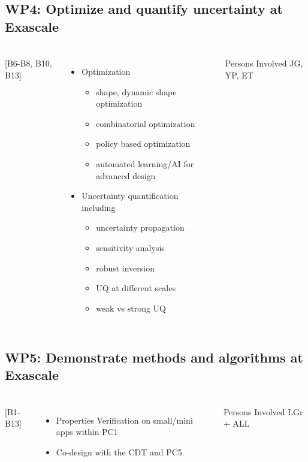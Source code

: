 \subsection{WP4: Optimize and quantify uncertainty at Exascale }
\begin{frame}
  \frametitle{\insertsectionhead}
  \framesubtitle{\insertsubsectionhead}
  \begin{columns}
    [B6-B8, B10, B13]
    \begin{itemize}
      \item Optimization 
      \begin{itemize}
        \item shape, dynamic shape optimization
        \item combinatorial optimization
        \item policy based optimization
        \item automated learning/AI for advanced design
      \end{itemize}
      \item Uncertainty quantification including 
      \begin{itemize}
        \item uncertainty propagation
        \item sensitivity analysis
        \item robust inversion
        \item UQ at different scales
        \item weak vs strong UQ
      \end{itemize}
    \end{itemize}
    \begin{alertblock}{Persons Involved}
      JG, YP, ET
    \end{alertblock}
  \end{columns}
\end{frame}
\subsection{WP5: Demonstrate methods and algorithms at Exascale}
\begin{frame}
  \frametitle{\insertsectionhead}
  \framesubtitle{\insertsubsectionhead}

  \begin{columns}
    [B1-B13]
    \begin{itemize}
      \item Properties Verification on small/mini apps within PC1
      \item Co-design with the CDT and PC5
    \end{itemize}
    \begin{alertblock}{Persons Involved}
      LGr + ALL
    \end{alertblock}
  \end{columns}

\end{frame}
